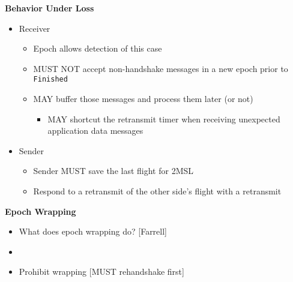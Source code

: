 \documentclass[helvetica]{seminar}
\newcommand{\heading}[1]{%
  \begin{center} 
    \large\bf 
    #1 
  \end{center} 
  \vspace{.4 in}}
\begin{document}
\begin{slide}
\heading{Behavior Under Loss}

\begin{itemize}
\item Receiver
  \begin{itemize}
  \item Epoch allows detection of this case
  \item  MUST NOT accept non-handshake messages in a new epoch prior to \verb^Finished^
  \item  MAY buffer those messages and process them later (or not)
    \begin{itemize}
    \item MAY shortcut the retransmit timer when receiving unexpected application data messages
    \end{itemize}
  \end{itemize}

\item Sender
  \begin{itemize}
  \item Sender MUST save the last flight for 2MSL
  \item Respond to a retransmit of the other side's flight with a retransmit
  \end{itemize}
\end{itemize}

\end{slide}



\begin{slide}
\heading{Epoch Wrapping}

\begin{itemize}
\item What does epoch wrapping do? [Farrell]
\item[]
\item Prohibit wrapping [MUST rehandshake first]
\end{itemize}
\end{slide}
\end{document}
